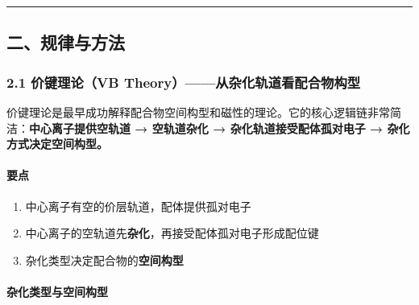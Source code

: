 \documentclass[a4paper,11pt]{ctexart}
\providecommand{\tightlist}{\setlength{\itemsep}{0pt}\setlength{\parskip}{0pt}}
\begin{document}
\begin{center}\rule{0.5\linewidth}{0.5pt}\end{center}

\subsection{二、规律与方法}\label{ux4e8cux89c4ux5f8bux4e0eux65b9ux6cd5}

\subsubsection{2.1 价键理论（VB Theory）------从杂化轨道看配合物构型}\label{ux4ef7ux952eux7406ux8bbavb-theoryux4eceux6742ux5316ux8f68ux9053ux770bux914dux5408ux7269ux6784ux578b}

价键理论是最早成功解释配合物空间构型和磁性的理论。它的核心逻辑链非常简洁：\textbf{中心离子提供空轨道 → 空轨道杂化 → 杂化轨道接受配体孤对电子 → 杂化方式决定空间构型。}

\paragraph{要点}\label{ux8981ux70b9}

\begin{enumerate}
\def\labelenumi{\arabic{enumi}.}
\tightlist
\item
  中心离子有空的价层轨道，配体提供孤对电子
\item
  中心离子的空轨道先\textbf{杂化}，再接受配体孤对电子形成配位键
\item
  杂化类型决定配合物的\textbf{空间构型}
\end{enumerate}

\paragraph{杂化类型与空间构型}\label{ux6742ux5316ux7c7bux578bux4e0eux7a7aux95f4ux6784ux578b}
\end{document}
